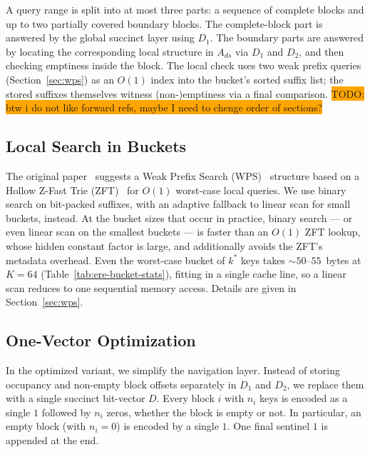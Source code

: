 A query range is split into at most three parts: a sequence of complete blocks
and up to two partially covered boundary blocks.
The complete-block part is answered by the global succinct layer using $D_1$.
The boundary parts are answered by locating the corresponding local
structure in $A_{ds}$ via $D_1$ and $D_2$, and then checking emptiness
inside the block.
The local check uses two weak prefix queries (Section~\ref{sec:wps})
as an $O(1)$ index into the bucket's sorted suffix list; the stored
suffixes themselves witness (non-)emptiness via a final comparison.
\colorbox{orange}{TODO: btw i do not like forward refs, maybe I need to chenge order of sections?}

\subsection{Local Search in Buckets}
\label{subsec:ere-local-search}

The original paper~\citep{goswami2015approximate} suggests a Weak Prefix Search
(WPS)~\citep{belazzougui2010fast} structure based on a Hollow Z-Fast Trie
(ZFT)~\citep{belazzougui2009monotone} for $O(1)$ worst-case local queries.
We use binary search on bit-packed suffixes, with an adaptive fallback to linear scan for small buckets, instead.
At the bucket sizes that occur in practice, binary search --- or even
linear scan on the smallest buckets --- is faster than an $O(1)$ ZFT
lookup, whose hidden constant factor is large, and additionally avoids
the ZFT's metadata overhead.
Even the worst-case bucket of $k^*$ keys takes ${\sim}50$--$55$~bytes
at $K = 64$ (Table~\ref{tab:ere-bucket-stats}), fitting in a single
cache line, so a linear scan reduces to one sequential memory access.
Details are given in Section~\ref{sec:wps}.

\subsection{One-Vector Optimization}
\label{subsec:ere-one-vector}

In the optimized variant, we simplify the navigation layer.
Instead of storing occupancy and non-empty block offsets separately in $D_1$ and $D_2$, we replace them with a single succinct bit-vector $D$.
Every block $i$ with $n_i$ keys is encoded as a single $1$ followed by $n_i$ zeros, whether the block is empty or not.
In particular, an empty block (with $n_i = 0$) is encoded by a single $1$.
One final sentinel $1$ is appended at the end.


